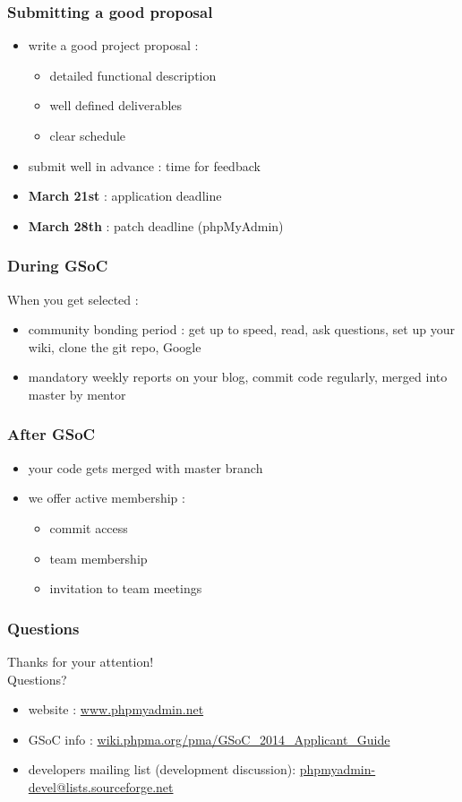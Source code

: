 \documentclass[14pt]{beamer}
\begin{document}
  \begin{frame}
    \frametitle{Submitting a good proposal}
    \begin{itemize}
      \item write a good project proposal :
      \begin{itemize}
        \item detailed functional description
        \item well defined deliverables
        \item clear schedule
      \end{itemize}
      \item submit well in advance : time for feedback
      \item \textbf{March 21st} : application deadline
      \item \textbf{March 28th} : patch deadline (phpMyAdmin)
    \end{itemize}
  \end{frame}
  \begin{frame}
    \frametitle{During GSoC}
    When you get selected :
    \begin{itemize}
      \item community bonding period : get up to speed, read, ask questions, set up your wiki, clone the git repo, Google 
      \item mandatory weekly reports on your blog, commit code regularly, merged into master by mentor
    \end{itemize}
  \end{frame}
  \begin{frame}
    \frametitle{After GSoC}
    \begin{itemize}
      \item your code gets merged with master branch
      \item we offer active membership :
      \begin{itemize}
        \item commit access
        \item team membership
        \item invitation to team meetings
      \end{itemize}
    \end{itemize}
  \end{frame}
  \begin{frame}
   \frametitle{Questions}
    Thanks for your attention!\\
    Questions?
    \begin{itemize}
      \item website : \href{http://www.phpmyadmin.net/}{www.phpmyadmin.net}
      \item GSoC info : \href{http://wiki.phpma.org/pma/GSoC\_2014\_Applicant\_Guide}{wiki.phpma.org/pma/GSoC\_2014\_Applicant\_Guide}
      \item developers mailing list (development discussion): \href{mailto:phpmyadmin-devel@lists.sourceforge.net}{phpmyadmin-devel@lists.sourceforge.net}
    \end{itemize}
  \end{frame}
\end{document}
